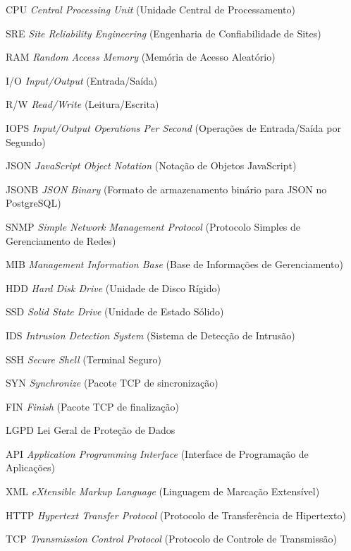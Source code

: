 \documentclass[
    12pt
    ,oneside
    ,a4paper
    ,chapter=TITLE
    ,section=TITLE
    ,sumario=abnt-6027-2012]{abntex2}
\begin{document}
\begin{siglas}
    \item[CPU]    \textit{Central Processing Unit} (Unidade Central de Processamento)
    \item[SRE]    \textit{Site Reliability Engineering} (Engenharia de Confiabilidade de Sites)
    \item[RAM]    \textit{Random Access Memory} (Memória de Acesso Aleatório)
    \item[I/O]    \textit{Input/Output} (Entrada/Saída)
    \item[R/W]    \textit{Read/Write} (Leitura/Escrita)
    \item[IOPS]   \textit{Input/Output Operations Per Second} (Operações de Entrada/Saída por Segundo)
    \item[JSON]   \textit{JavaScript Object Notation} (Notação de Objetos JavaScript)
    \item[JSONB]  \textit{JSON Binary} (Formato de armazenamento binário para JSON no PostgreSQL)
    \item[SNMP]   \textit{Simple Network Management Protocol} (Protocolo Simples de Gerenciamento de Redes)
    \item[MIB]    \textit{Management Information Base} (Base de Informações de Gerenciamento)
    \item[HDD]    \textit{Hard Disk Drive} (Unidade de Disco Rígido)
    \item[SSD]    \textit{Solid State Drive} (Unidade de Estado Sólido)
    \item[IDS]    \textit{Intrusion Detection System} (Sistema de Detecção de Intrusão)
    \item[SSH]    \textit{Secure Shell} (Terminal Seguro)
    \item[SYN]    \textit{Synchronize} (Pacote TCP de sincronização)
    \item[FIN]    \textit{Finish} (Pacote TCP de finalização)
    \item[LGPD]   Lei Geral de Proteção de Dados
    \item[API]    \textit{Application Programming Interface} (Interface de Programação de Aplicações)
    \item[XML]    \textit{eXtensible Markup Language} (Linguagem de Marcação Extensível)
    \item[HTTP]   \textit{Hypertext Transfer Protocol} (Protocolo de Transferência de Hipertexto)
    \item[TCP]    \textit{Transmission Control Protocol} (Protocolo de Controle de Transmissão)
\end{siglas}
\end{document}

